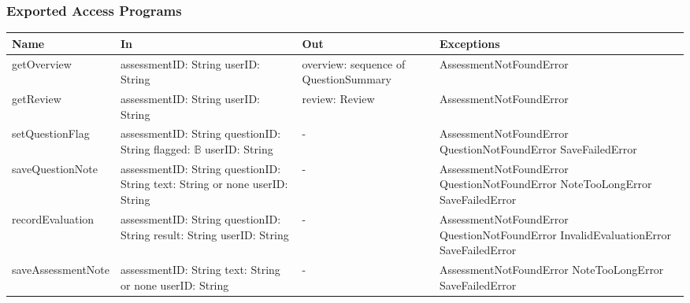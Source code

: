 \documentclass[12pt, titlepage]{article}
\begin{document}
\subsubsection{Exported Access Programs}
{\small
\begin{longtable}{>{\raggedright\arraybackslash}p{3.4cm} >{\raggedright\arraybackslash}p{4.3cm} >{\raggedright\arraybackslash}p{3.2cm} >{\raggedright\arraybackslash}p{4.3cm}}
\hline
\textbf{Name} & \textbf{In} & \textbf{Out} & \textbf{Exceptions} \\
\hline
\endhead
getOverview & assessmentID: String \newline userID: String & overview: sequence of QuestionSummary & AssessmentNotFoundError \\[4pt]
getReview & assessmentID: String \newline userID: String & review: Review & AssessmentNotFoundError \\[4pt]
setQuestionFlag & assessmentID: String \newline questionID: String \newline flagged: $\mathbb{B}$ \newline userID: String & - & AssessmentNotFoundError \newline QuestionNotFoundError \newline SaveFailedError \\[4pt]
saveQuestionNote & assessmentID: String \newline questionID: String \newline text: String or none \newline userID: String & - & AssessmentNotFoundError \newline QuestionNotFoundError \newline NoteTooLongError \newline SaveFailedError \\[4pt]
recordEvaluation & assessmentID: String \newline questionID: String \newline result: String \newline userID: String & - & AssessmentNotFoundError \newline QuestionNotFoundError \newline InvalidEvaluationError \newline SaveFailedError \\[4pt]
saveAssessmentNote & assessmentID: String \newline text: String or none \newline userID: String & - & AssessmentNotFoundError \newline NoteTooLongError \newline SaveFailedError \\[4pt]
\hline
\end{longtable}
}
\end{document}
